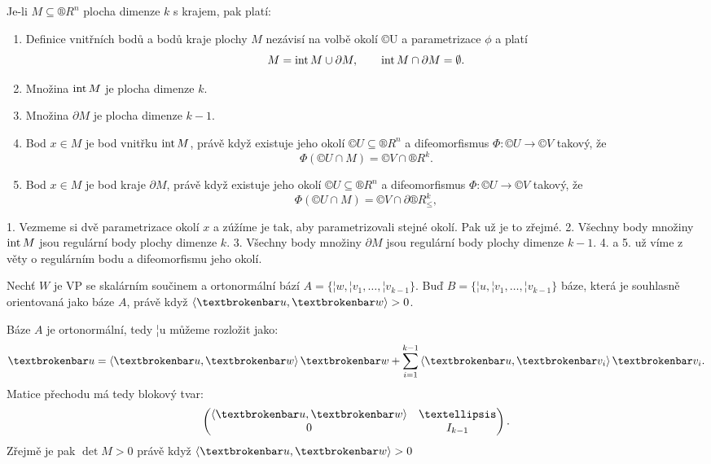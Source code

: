 \documentclass[12pt]{article}                   %
\begin{document}
        \begin{lemma}
            Je-li $M \subseteq ®R^n$ plocha dimenze $k$ s krajem, pak platí:
            
            \begin{enumerate}
                \item Definice vnitřních bodů a bodů kraje plochy $M$ nezávisí na volbě okolí ©U a parametrizace $\phi$ a platí
                        $$ M = \operatorname{int} M \cup \partial M, \qquad \operatorname{int} M \cap \partial M = \emptyset. $$ 
                \item Množina $\operatorname{int} M$ je plocha dimenze $k$.
                \item Množina $\partial M$ je plocha dimenze $k-1$.
                \item Bod $x \in M$ je bod vnitřku $\operatorname{int} M$, právě když existuje jeho okolí $©U \subseteq ®R^n$ a difeomorfismus $\Phi: ©U \rightarrow ©V$ takový, že
                        $$ \Phi(©U \cap M) = ©V \cap ®R^k. $$
                \item Bod $x \in M$ je bod kraje $\partial M$, právě když existuje jeho okolí $©U \subseteq ®R^n$ a difeomorfismus $\Phi: ©U \rightarrow ©V$ takový, že
                        $$ \Phi(©U \cap M) = ©V \cap \partial ®R^k_{≤}, $$
            \end{enumerate}

            \begin{dukazin}
                1. Vezmeme si dvě parametrizace okolí $x$ a zúžíme je tak, aby parametrizovali stejné okolí. Pak už je to zřejmé. 2. Všechny body množiny $\operatorname{int} M$ jsou regulární body plochy dimenze $k$. 3. Všechny body množiny $\partial M$ jsou regulární body plochy dimenze $k-1$. 4. a 5. už víme z věty o regulárním bodu a difeomorfismu jeho okolí.
            \end{dukazin}
        \end{lemma}

        \begin{lemma}
            Nechť $W$ je VP se skalárním součinem a ortonormální bází $A = \{¦w, ¦v_1, …, ¦v_{k-1}\}$. Buď $B = \{¦u, ¦v_1, …, ¦v_{k-1}\}$ báze, která je souhlasně orientovaná jako báze $A$, právě když $\<¦u, ¦w\> > 0$.

            \begin{dukazin}
                Báze $A$ je ortonormální, tedy ¦u můžeme rozložit jako:
                $$ ¦u = \<¦u, ¦w\>¦w + \sum_{i=1}^{k-1} \<¦u, ¦v_i\>¦v_i. $$
                Matice přechodu má tedy blokový tvar:
                $$ \begin{pmatrix} \<¦u, ¦w\> & … \\ 0 & I_{k-1} \end{pmatrix}. $$
                Zřejmě je pak $\det M > 0$ právě když $\<¦u, ¦w\> > 0$
            \end{dukazin}
        \end{lemma}
\end{document}

